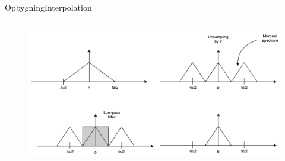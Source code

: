 \begin{frame}{Opbygning}{Interpolation}
\begin{columns}
\begin{column}{0.3\textwidth}
\begin{figure}
			\end{figure}
			\begin{figure}
				\centering
				\includegraphics[width=\textwidth]{upsampling4}
			\end{figure}
		\end{column}
	\end{columns}
	
\end{frame}


